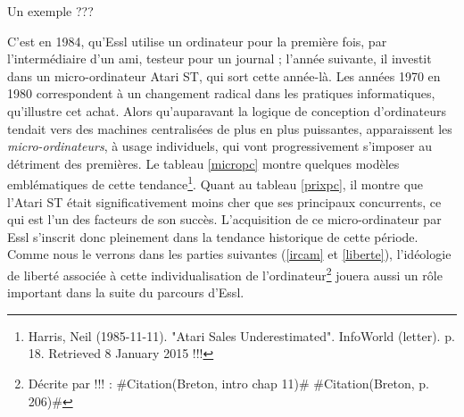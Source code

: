 \documentclass[a4paper,12pt]{article}
\newcommand{\guill}[1]{«~#1~»}
\newcommand{\zitat}[2]{\#Citation(#2)\#}
\newcommand{\tpp}[0]{[\dots]}
\begin{document}
Un exemple ???

C'est en 1984, qu'Essl utilise un ordinateur pour la première fois, par l'intermédiaire d'un ami, testeur pour un journal ; l'année suivante, il investit dans un micro-ordinateur Atari ST, qui sort cette année-là. Les années 1970 en 1980 correspondent à un changement radical dans les pratiques informatiques, qu'illustre cet achat. Alors qu'auparavant la logique de conception d'ordinateurs tendait vers des machines centralisées de plus en plus puissantes, apparaissent les \emph{micro-ordinateurs}, à usage individuels, qui vont progressivement s'imposer au détriment des premières. Le tableau \ref{micropc} montre quelques modèles emblématiques de cette tendance\footnote{Harris, Neil (1985-11-11). "Atari Sales Underestimated". InfoWorld (letter). p. 18. Retrieved 8 January 2015 !!!}. Quant au tableau \ref{prixpc}, il montre que l'Atari ST était significativement moins cher que ses principaux concurrents, ce qui est l'un des facteurs de son succès. L'acquisition de ce micro-ordinateur par Essl s'inscrit donc pleinement dans la tendance historique de cette période. Comme nous le verrons dans les parties suivantes (\ref{ircam} et \ref{liberte}), l'idéologie de liberté associée à cette individualisation de l'ordinateur\footnote{Décrite par !!! : \zitat{L'invention du micro-ordinateur par les radicaux californiens \tpp~avait pour objectif explicite de battre en brèche la centralisation et la possession des précieuses \guill{informations} par quelques privilégiés. La \guill{guérilla} micro-informatique a en partie porté ses fruits. Elle a constitué une sorte de révolution dans la révolution et son radicalisme a été en grande partie à l'origine de la \guill{culture informatique}, partagée dans un large public et facteur de démocratisation de la vie sociale et du savoir.}
{Breton, intro chap 11}
\zitat{L'informatique de la deuxième période, qui avait été considérée comme une menace pour les libertés, a acquis avec le micro-ordinateur une image beaucoup plus \guill{conviviale}. Pour les générations nées dans les années soixante, informatique et liberté sont désormais synonymes. La société de l'information centralisée devient progressivement une société de communication, une société de réseaux.}
{Breton, p. 206}} jouera aussi un rôle important dans la suite du parcours d'Essl.
\end{document}
